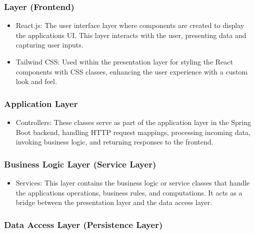 \subsubsection{Layer (Frontend)}

\begin{itemize}

\item React.js: The user interface layer where components are created to display the applications UI. This layer interacts with the user, presenting data and capturing user inputs.
\item Tailwind CSS: Used within the presentation layer for styling the React components with CSS classes, enhancing the user experience with a custom look and feel.

\end{itemize}

\subsubsection{Application Layer}

\begin{itemize}

\item Controllers: These classes serve as part of the application layer in the Spring Boot backend, handling HTTP request mappings, processing incoming data, invoking business logic, and returning responses to the frontend.

\end{itemize}

\subsubsection{Business Logic Layer (Service Layer)}

\begin{itemize}

\item Services: This layer contains the business logic or service classes that handle the applications operations, business rules, and computations. It acts as a bridge between the presentation layer and the data access layer.

\end{itemize}

\subsubsection{Data Access Layer (Persistence Layer)}

